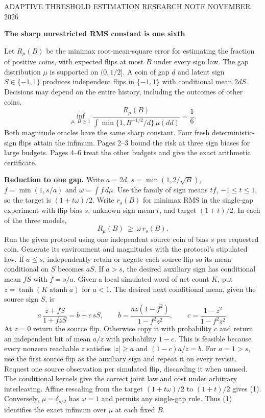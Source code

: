 \documentclass[11pt]{article}
\newcommand{\atanh}{\operatorname{atanh}}
\newcommand{\heading}[1]{{\LARGE\bfseries\color{ink} #1}\par\smallskip}
\begin{document}
{\small\color{ink} ADAPTIVE THRESHOLD ESTIMATION \hfill RESEARCH NOTE  NOVEMBER 2026}\par
\heading{The sharp unrestricted RMS constant is one sixth}
Let $R_\mu(B)$ be the minimax root-mean-square error for estimating the fraction of positive coins, with expected flips at most $B$ under every sign law. The gap distribution $\mu$ is supported on $(0,1/2]$. A coin of gap $d$ and latent sign $S\in\{-1,1\}$ produces independent flips in $\{-1,1\}$ with conditional mean $2dS$. Decisions may depend on the entire history, including the outcomes of other coins.
\[
 \boxed{\displaystyle
 \inf_{\mu,\, B\ge1}\frac{R_\mu(B)}{\int\min\{1,B^{-1/2}/d\}\,\mu(dd)}=\frac16 .}
\]
Both magnitude oracles have the same sharp constant. Four fresh deterministic-sign flips attain the infimum. Pages 2--3 bound the risk at three sign biases for large budgets. Pages 4--6 treat the other budgets and give the exact arithmetic certificate.

\textbf{Reduction to one gap.} Write $a=2d$, $s=\min(1,2/\sqrt B)$, $f=\min(1,s/a)$ and $\omega=\int f\,d\mu$. Use the family of sign means $tf$, $-1\le t\le1$, so the target is $(1+t\omega)/2$. Write $r_s(B)$ for minimax RMS in the single-gap experiment with flip bias $s$, unknown sign mean $t$, and target $(1+t)/2$. In each of the three models,
\[
                  R_\mu(B)\ \ge\ \omega\,r_s(B).
                  \tag{1}
\]
Run the given protocol using one independent source coin of bias $s$ per requested coin. Generate its environment and magnitudes with the protocol's stipulated law. If $a\le s$, independently retain or negate each source flip so its mean conditional on $S$ becomes $aS$. If $a>s$, the desired auxiliary sign has conditional mean $fS$ with $f=s/a$. Given a local simulated word of net count $K$, put $z=\tanh(K\atanh a)$ for $a<1$. The desired next conditional mean, given the source sign $S$, is
\[
           a\,\frac{z+fS}{1+fzS}
       = b+c\,sS,\qquad
     b=\frac{az(1-f^2)}{1-f^2z^2},\qquad c=\frac{1-z^2}{1-f^2z^2}.
\]
At $z=0$ return the source flip. Otherwise copy it with probability $c$ and return an independent bit of mean $a/z$ with probability $1-c$. This is feasible because every nonzero reachable $z$ satisfies $|z|\ge a$ and $(1-c)a/z=b$. For $a=1>s$, use the first source flip as the auxiliary sign and repeat it on every revisit. Request one source observation per simulated flip, discarding it when unused. The conditional kernels give the correct joint law and cost under arbitrary interleaving. Affine rescaling from the target $(1+t\omega)/2$ to $(1+t)/2$ gives (1). Conversely, $\mu=\delta_{s/2}$ has $\omega=1$ and permits any single-gap rule. Thus (1) identifies the exact infimum over $\mu$ at each fixed $B$.
\end{document}
